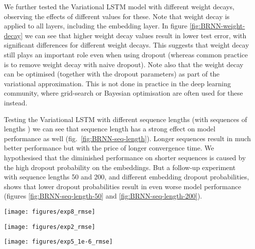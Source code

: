 \documentclass{article}
\theoremstyle{definition}
\begin{document}
We further tested the Variational LSTM model with different weight decays, observing the effects of different values for these. Note that weight decay is applied to all layers, including the embedding layer. In figure \ref{fig:BRNN-weight-decay} we can see that higher weight decay values result in lower test error, with significant differences for different weight decays. This suggests that weight decay still plays an important role even when using dropout (whereas common practice is to remove weight decay with naive dropout). Note also that the weight decay can be optimised (together with the dropout parameters) as part of the variational approximation. This is not done in practice in the deep learning community, where grid-search or Bayesian optimisation are often used for these instead.


Testing the Variational LSTM with different sequence lengths (with sequences of lengths ) we can see that sequence length has a strong effect on model performance as well (fig.\ \ref{fig:BRNN-seq-length}). Longer sequences result in much better performance but with the price of longer convergence time. We hypothesised that the diminished performance on shorter sequences is caused by the high dropout probability on the embeddings. But a follow-up experiment with sequence lengths  50 and 200, and different embedding dropout probabilities, shows that lower dropout probabilities result in even worse model performance (figures \ref{fig:BRNN-seq-length-50} and \ref{fig:BRNN-seq-length-200}).




\begin{figure*}[b!]
\begin{minipage}{0.3\linewidth}
\vspace{-10mm}
\texttt{[image: figures/exp8\_rmse]}

\vspace{-2mm}
\caption{ with fixed .}
\label{fig:BRNN-seq-length-200}
\end{minipage}
\hspace{2mm}
\begin{minipage}{0.3\linewidth}
\vspace{-10mm}
\texttt{[image: figures/exp2\_rmse]}

\vspace{-2mm}
\caption{Test error for Variational LSTM with different weight decays.}
\label{fig:BRNN-weight-decay}
\end{minipage}
\hspace{2mm}
\begin{minipage}{0.3\linewidth}
\texttt{[image: figures/exp5\_1e-6\_rmse]}

\vspace{-2mm}
\caption{Variational LSTM test error for different sequence lengths ( cut-offs).}
\label{fig:BRNN-seq-length}
\end{minipage}
\end{figure*}
\end{document}
